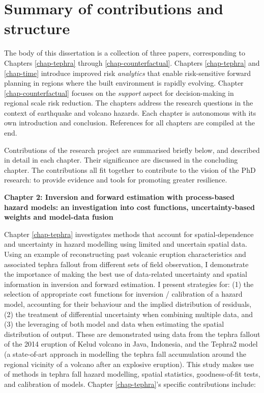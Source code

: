 \section{Summary of contributions and structure} \label{subsec-struct}

The body of this  dissertation is a collection of three papers, corresponding to Chapters \ref{chap-tephra} through \ref{chap-counterfactual}. Chapters \ref{chap-tephra} and \ref{chap-time} introduce improved risk \textit{analytics} that enable risk-sensitive forward planning in regions where the built environment is rapidly evolving. Chapter \ref{chap-counterfactual} focuses on the \textit{support} aspect for decision-making in regional scale risk reduction. The chapters address the research questions in the context of earthquake and volcano hazards. Each chapter is autonomous with its own introduction and conclusion. References for all chapters are compiled at the end. 

Contributions of the research project are summarised briefly below, and described in detail in each chapter. Their significance are discussed in the concluding chapter. The contributions all fit together to contribute to the vision of the PhD research: to provide evidence and tools for promoting greater resilience. 

\newcommand{\varitem}[3][black]{%
  \item[ \colorbox{#2}{\textcolor{#1}{\makebox(5.5,7){#3}}}  ]}

\vspace{1cm}
\noindent
\textbf{Chapter 2: Inversion and forward estimation with process-based hazard models: an investigation into cost functions, uncertainty-based weights and model-data fusion}
\noindent

Chapter \ref{chap-tephra} investigates methods that account for spatial-dependence and uncertainty in hazard modelling using limited and uncertain spatial data. Using an example of reconstructing past volcanic eruption characteristics and associated tephra fallout from different sets of field observation, I demonstrate the importance of making the best use of data-related uncertainty and spatial information in inversion and forward estimation. I present strategies for: (1) the selection of appropriate cost functions for inversion / calibration of a hazard model, accounting for their behaviour and the implied distribution of residuals, (2) the treatment of differential uncertainty when combining multiple data, and (3) the leveraging of both model and data when estimating the spatial distribution of output. These are demonstrated using data from the tephra fallout of the 2014 eruption of Kelud volcano in Java, Indonesia, and the Tephra2 model (a state-of-art approach in modelling the tephra fall accumulation around the regional vicinity of a volcano after an explosive eruption). This study makes use of methods in tephra fall hazard modelling, spatial statistics, goodness-of-fit tests, and calibration of models. Chapter \ref{chap-tephra}'s specific contributions include:

